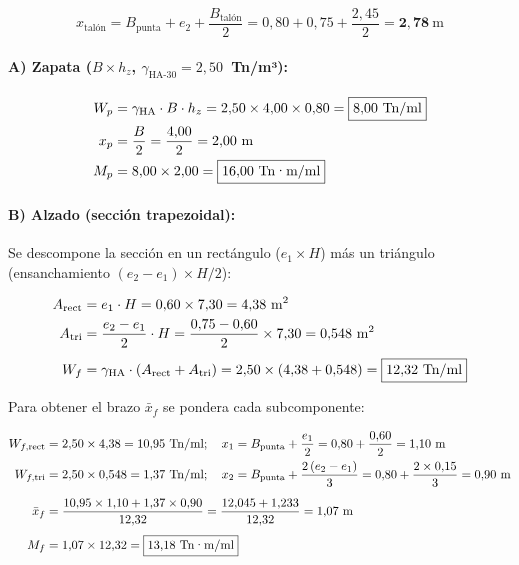 \[
  x_\text{talón} = B_\text{punta} + e_2 + \frac{B_\text{talón}}{2}
    = 0{,}80 + 0{,}75 + \frac{2{,}45}{2} = \mathbf{2{,}78}~\text{m}
\]

\paragraph{A) Zapata ($B \times h_z$, $\gamma_\text{HA-30} = 2{,}50$~Tn/m³):}

\begin{align*}
  W_p &= \gamma_\text{HA} \cdot B \cdot h_z
       = 2{,}50 \times 4{,}00 \times 0{,}80
       = \boxed{8{,}00~\text{Tn/ml}} \\
  x_p &= \frac{B}{2} = \frac{4{,}00}{2} = 2{,}00~\text{m} \\
  M_p &= 8{,}00 \times 2{,}00 = \boxed{16{,}00~\text{Tn·m/ml}}
\end{align*}

\paragraph{B) Alzado (sección trapezoidal):}

Se descompone la sección en un rectángulo ($e_1 \times H$) más un triángulo
(ensanchamiento $(e_2 - e_1) \times H / 2$):

\begin{align*}
  A_\text{rect} &= e_1 \cdot H = 0{,}60 \times 7{,}30 = 4{,}38~\text{m}^2 \\
  A_\text{tri}  &= \frac{e_2 - e_1}{2} \cdot H
                = \frac{0{,}75 - 0{,}60}{2} \times 7{,}30 = 0{,}548~\text{m}^2 \\[4pt]
  W_f &= \gamma_\text{HA} \cdot (A_\text{rect} + A_\text{tri})
       = 2{,}50 \times (4{,}38 + 0{,}548)
       = \boxed{12{,}32~\text{Tn/ml}}
\end{align*}

Para obtener el brazo $\bar{x}_f$ se pondera cada subcomponente:

\begin{align*}
  W_{f,\text{rect}} &= 2{,}50 \times 4{,}38 = 10{,}95~\text{Tn/ml};
    \quad x_1 = B_\text{punta} + \frac{e_1}{2}
             = 0{,}80 + \frac{0{,}60}{2} = 1{,}10~\text{m} \\
  W_{f,\text{tri}}  &= 2{,}50 \times 0{,}548 = 1{,}37~\text{Tn/ml};
    \quad x_2 = B_\text{punta} + \frac{2\,(e_2 - e_1)}{3}
             = 0{,}80 + \frac{2 \times 0{,}15}{3} = 0{,}90~\text{m} \\[6pt]
  \bar{x}_f &= \frac{10{,}95 \times 1{,}10 + 1{,}37 \times 0{,}90}{12{,}32}
             = \frac{12{,}045 + 1{,}233}{12{,}32} = 1{,}07~\text{m} \\[4pt]
  M_f &= 1{,}07 \times 12{,}32 = \boxed{13{,}18~\text{Tn·m/ml}}
\end{align*}

